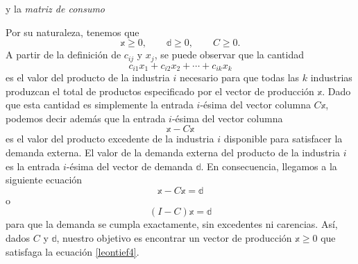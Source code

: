 y la \emph{matriz de consumo}
\begin{matrizn}
\end{matrizn}
Por su naturaleza, tenemos que
$$\mathbb{x} \geq 0, \qquad \mathbb{d} \geq 0, \qquad C \geq 0.$$
A partir de la definición de $c_{ij}$ y $x_j$, se puede observar que la cantidad 
$$c_{i1}x_1 + c_{i2}x_2 + \cdots + c_{ik}x_k$$
es el valor del producto de la industria $i$ necesario para que todas las $k$ industrias produzcan el total de productos especificado por el vector de producción $\mathbb{x}$. Dado que esta cantidad es simplemente la entrada $i$-ésima del vector columna $C\mathbb{x}$, podemos decir además que la entrada $i$-ésima del vector columna
$$\mathbb{x} - C\mathbb{x}$$
es el valor del producto excedente de la industria $i$ disponible para satisfacer la demanda externa. El valor de la demanda externa del producto de la industria $i$ es la entrada $i$-ésima del vector de demanda $\mathbb{d}$. En consecuencia, llegamos a la siguiente ecuación
$$\mathbb{x} - C\mathbb{x} = \mathbb{d}$$
o
\begin{equation}
    (I - C)\mathbb{x} = \mathbb{d} \label{leontief4}
\end{equation}
para que la demanda se cumpla exactamente, sin excedentes ni carencias. Así, dados $C$ y $\mathbb{d}$, nuestro objetivo es encontrar un vector de producción $\mathbb{x} \geq 0$ que satisfaga la ecuación \eqref{leontief4}.

